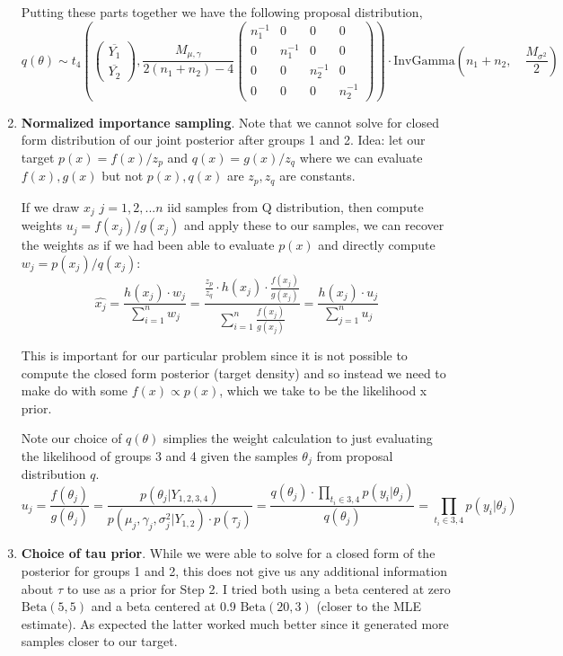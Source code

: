 \documentclass[12pt,letterpaper,twoside]{article}
\begin{document}
\begin{enumerate}[label=(\alph*)]
    Putting these parts together we have the following proposal distribution,
    $$ q(\theta) \sim t_4\left(\left(\begin{matrix*}
        \overline{Y_1}\\ \overline{Y_2} \end{matrix*}\right), \frac{M_{\mu, \gamma}}{2(n_1 + n_2) - 4}\left(\begin{matrix*}
        n_1^{-1} & 0 & 0 & 0 \\ 0 & n_1^{-1} & 0 & 0 \\ 0 & 0 & n_2^{-1} & 0 \\ 0 & 0 & 0 & n_2^{-1}
        \end{matrix*}\right)\right) \cdot \text{InvGamma}\left(n_1+n_2, \quad \frac{M_{\sigma^2}}{2} \right) $$

    \item \textbf{Normalized importance sampling}. Note that we cannot solve 
    for closed form distribution of our joint posterior after groups 1 and 2. 
    Idea: let our target $p(x) = f(x) / z_p$ and $q(x) = g(x) / z_q$ where 
    we can evaluate $f(x), g(x)$ but not $p(x), q(x)$ are $z_p, z_q$ are 
    constants. \newline

    If we draw $x_j$ $j=1,2,...n$ iid samples from Q distribution, then compute 
    weights $u_j = f(x_j) / g(x_j)$ and apply these to our samples, we can 
    recover the weights as if we had been able to evaluate $p(x)$ and 
    directly compute $w_j = p(x_j) / q(x_j)$:
    $$ \hat{x_j} = \frac{h(x_j) \cdot w_j}{\sum_{i=1}^n w_j} = \frac{\frac{z_p}{z_q} \cdot h(x_j) \cdot \frac{f(x_j)}{g(x_j)}}{\sum_{i=1}^n \frac{f(x_j)}{g(x_j)}} = \frac{h(x_j) \cdot u_j}{\sum_{j=1}^n u_j}$$

    This is important for our particular problem since it is not possible 
    to compute the closed form posterior (target density) and so instead 
    we need to make do with some $f(x) \propto p(x)$, which we take to be
    the likelihood x prior. \newline
    
    Note our choice of $q(\theta)$  simplies the weight calculation to just
    evaluating the likelihood of groups 3 and 4 given the samples $\theta_j$ 
    from proposal distribution $q$.
    $$ u_j = \frac{f(\theta_j)}{g(\theta_j)} = \frac{p(\theta_j|Y_{1,2,3,4})}{p(\mu_j, \gamma_j, \sigma_j^2|Y_{1,2}) \cdot p(\tau_j)} = \frac{q(\theta_j) \cdot \prod_{t_i\in{3,4}} p(y_i|\theta_j)}{q(\theta_j)} = \prod_{t_i\in{3,4}} p(y_i|\theta_j) $$

    \item \textbf{Choice of tau prior}. While we were able to solve for a 
    closed form of the posterior for groups 1 and 2, this does not give us 
    any additional information about $\tau$ to use as a prior for Step 2. 
    I tried both using a beta centered at zero $\text{Beta}(5, 5)$ and a 
    beta centered at 0.9 $\text{Beta}(20, 3)$ (closer to the MLE estimate).
    As expected the latter worked much better since it generated more 
    samples closer to our target.

\end{enumerate}
\end{document}

